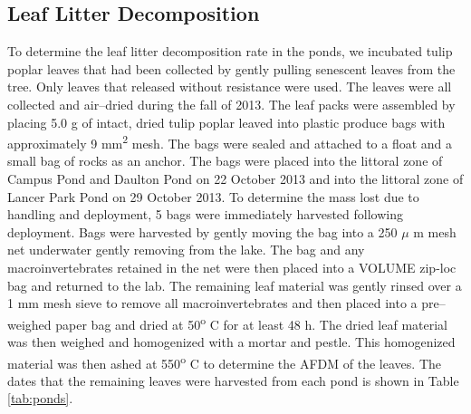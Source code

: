 \subsection{Leaf Litter Decomposition}

To determine the leaf litter decomposition rate in the ponds, we incubated tulip poplar leaves that had been collected by gently pulling senescent leaves from the tree. Only leaves that released without resistance were used.  The leaves were all collected and air--dried during the fall of 2013.  The leaf packs were assembled by placing 5.0 g of intact, dried tulip poplar leaved into plastic produce bags with approximately 9 mm\textsuperscript{2} mesh. The bags were sealed and attached to a float and a small bag of rocks as an anchor.  The bags were placed into the littoral zone of Campus Pond and Daulton Pond on 22 October 2013 and into the littoral zone of Lancer Park Pond on 29 October 2013. To determine the mass lost due to handling and deployment, 5 bags were immediately harvested following deployment. Bags were harvested by gently moving the bag into a 250 $\mu$ m mesh net underwater gently removing from the lake. The bag and any macroinvertebrates retained in the net were then placed into a VOLUME zip-loc bag and returned to the lab.  The remaining leaf material was gently rinsed over a 1 mm mesh sieve to remove all macroinvertebrates and then placed into a pre--weighed paper bag and dried at 50\textsuperscript{o} C for at least 48 h.  The dried leaf material was then weighed and homogenized with a mortar and pestle. This homogenized material was then ashed at 550\textsuperscript{o} C to determine the AFDM of the leaves. The dates that the remaining leaves were harvested from each pond is shown in Table \ref{tab:ponds}. 